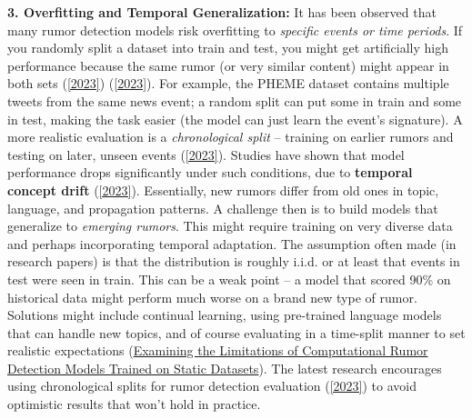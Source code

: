 \documentclass[12pt,a4paper]{report}
\begin{document}
\textbf{3. Overfitting and Temporal Generalization:} It has been observed that many rumor detection models risk overfitting to \textit{specific events or time periods}. If you randomly split a dataset into train and test, you might get artificially high performance because the same rumor (or very similar content) might appear in both sets (\href{https://aclanthology.org/2023.findings-eacl.55.pdf#:~:text=Ottawa%20Shooting%20and%20Charlie%20Hebdo,order%20to%20evaluate%20a%20rumor}{[2023]}) (\href{https://aclanthology.org/2023.findings-eacl.55.pdf#:~:text=temporality%20affects%20the%20predictive%20performance,chronological%20splits%20due%20to%20temporal}{[2023]}). For example, the PHEME dataset contains multiple tweets from the same news event; a random split can put some in train and some in test, making the task easier (the model can just learn the event’s signature). A more realistic evaluation is a \textit{chronological split} – training on earlier rumors and testing on later, unseen events (\href{https://aclanthology.org/2023.findings-eacl.55.pdf#:~:text=temporality%20affects%20the%20predictive%20performance,chronological%20splits%20due%20to%20temporal}{[2023]}). Studies have shown that model performance drops significantly under such conditions, due to \textbf{temporal concept drift} (\href{https://aclanthology.org/2023.findings-eacl.55.pdf#:~:text=temporality%20affects%20the%20predictive%20performance,chronological%20splits%20due%20to%20temporal}{[2023]}). Essentially, new rumors differ from old ones in topic, language, and propagation patterns. A challenge then is to build models that generalize to \textit{emerging rumors}. This might require training on very diverse data and perhaps incorporating temporal adaptation. The assumption often made (in research papers) is that the distribution is roughly i.i.d. or at least that events in test were seen in train. This can be a weak point – a model that scored 90\% on historical data might perform much worse on a brand new type of rumor. Solutions might include continual learning, using pre-trained language models that can handle new topics, and of course evaluating in a time-split manner to set realistic expectations (\href{https://arxiv.org/html/2309.11576v2#:~:text=Most%20of%20these%20rumor%20detection,58}{Examining the Limitations of Computational Rumor Detection Models Trained on Static Datasets}). The latest research encourages using chronological splits for rumor detection evaluation (\href{https://aclanthology.org/2023.findings-eacl.55.pdf#:~:text=temporality%20affects%20the%20predictive%20performance,chronological%20splits%20due%20to%20temporal}{[2023]}) to avoid optimistic results that won’t hold in practice.
\end{document}
